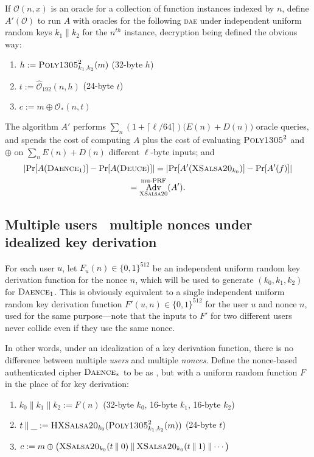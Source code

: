 \documentclass{article}
\newcommand{\term}[1]{\textbf{#1}}
\def\operatorsc#1{{%
  \ifmmode\let\next=\operatorname\else\let\next=\relax\fi\next{\textsc{#1}}}}
\def\Salsa#1/{\operatorsc{Salsa#1}}
\def\XSalsa#1/{\operatorsc{XSalsa#1}}
\def\HXSalsa#1/{\operatorsc{HXSalsa#1}}
\def\Poly#1/{\operatorsc{Poly#1}}
\def\DAENCE/{\operatorsc{Daence}}
\def\DEUCE/{\operatorsc{Deuce}}
\def\muPRF{%
  \ifmmode\def\next{\operatorname{mu-PRF}}%
    \else\def\next/{mu-\textsc{prf}}%
  \fi\next}
\def\DAE{%
  \ifmmode\def\next{\operatorname{DAE}}%
    \else\def\next/{\textsc{dae}}%
  \fi\next}
\DeclareMathOperator{\Adv}{Adv}
\newcommand{\concat}{\mathbin\|}
\begin{document}
If $\mathcal O(n,x)$ is an oracle for a collection of function
 instances indexed by $n$, define $A'(\mathcal O)$ to run $A$ with
 oracles for the following \DAE/ under independent uniform random keys
 $k_1 \concat k_2$ for the $n^{\mathit{th}}$ instance, decryption
 being defined the obvious way:
%
\begin{enumerate}
  \item $h := \Poly1305/^2_{k_1,k_2}(m)$
    \hfill (32-byte $h$)
  \item $t := \hat{\mathcal O}_{192}(n, h)$
    \hfill (24-byte $t$)
  \item $c := m \oplus \mathcal O_*(n, t)$
\end{enumerate}
%
The algorithm $A'$ performs
 $\sum_n (1 + \lceil\ell/64\rceil) \bigl(E(n) + D(n)\bigr)$ oracle
 queries, and spends the cost of computing $A$ plus the cost of
 evaluating $\Poly1305/^2$ and $\oplus$ on $\sum_n E(n) + D(n)$
 different $\ell$-byte inputs; and
%
\begin{multline*}
  \lvert\Pr[A(\DAENCE/_1)] - \Pr[A(\DEUCE/)]\rvert
   = \lvert\Pr[A'(\XSalsa20/_{k_0})] - \Pr[A'(f)]\rvert \\
   = \Adv^{\muPRF}_{\XSalsa20/}(A').
\end{multline*}

\subsection{Multiple users \vs\ multiple nonces under idealized key derivation}

For each user $u$, let $F_u(n) \in \{0,1\}^{512}$ be an independent
 uniform random key derivation function for the nonce $n$, which will
 be used to generate $(k_0, k_1, k_2)$ for $\DAENCE/_1$.
This is obviously equivalent to a single independent uniform random
 key derivation function $F'(u,n) \in \{0,1\}^{512}$ for the user $u$
 and nonce $n$, used for the same purpose---note that the inputs to
 $F'$ for two different users never collide even if they use the same
 nonce.

In other words, under an idealization of a key derivation function,
 there is no difference between multiple \emph{users} and multiple
 \emph{nonces}.
Define the nonce-based authenticated cipher \term{$\DAENCE/_*$} to be
 as \DAENCE/, but with a uniform random function $F$ in the place of
 \Salsa20/ for key derivation:
%
\begin{enumerate}
  \item $k_0 \concat k_1 \concat k_2 := F(n)$
    \hfill (32-byte $k_0$, 16-byte $k_1$, 16-byte $k_2$)
  \item $t \concat \_ := \HXSalsa20/_{k_0}(\Poly1305/^2_{k_1,k_2}(m))$
    \hfill (24-byte $t$)
  \item $c := m \oplus \bigl(\XSalsa20/_{k_0}(t \mathbin\| 0) \concat
      \XSalsa20/_{k_0}(t \mathbin\| 1) \concat \dotsb\bigr)$
\end{enumerate}
\end{document}
